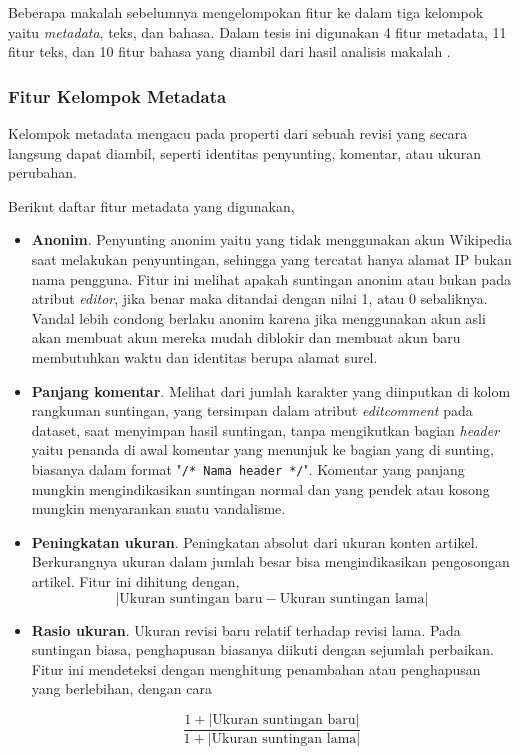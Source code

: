Beberapa makalah sebelumnya mengelompokan fitur ke dalam tiga kelompok yaitu
\textit{metadata}, teks, dan bahasa.
Dalam tesis ini digunakan 4 fitur metadata, 11 fitur teks, dan 10 fitur
bahasa yang diambil dari hasil analisis makalah
\textcite{mola2012wikipedia}.

\subsubsection{Fitur Kelompok Metadata}

Kelompok metadata mengacu pada properti dari sebuah revisi yang secara langsung
dapat diambil, seperti identitas penyunting, komentar, atau ukuran perubahan.

Berikut daftar fitur metadata yang digunakan,

\begin{itemize}

\item \textbf{Anonim}.
Penyunting anonim yaitu yang tidak menggunakan akun Wikipedia saat melakukan
penyuntingan, sehingga yang tercatat hanya alamat IP bukan nama pengguna.
Fitur ini melihat apakah suntingan anonim atau bukan pada atribut
\textit{editor}, jika benar maka ditandai dengan nilai 1, atau 0 sebaliknya.
Vandal lebih condong berlaku anonim karena jika menggunakan akun asli akan
membuat akun mereka mudah diblokir dan membuat akun baru membutuhkan waktu dan
identitas berupa alamat surel.

\item \textbf{Panjang komentar}.
Melihat dari jumlah karakter yang diinputkan di kolom rangkuman suntingan, yang
tersimpan dalam atribut \textit{editcomment} pada dataset, saat menyimpan hasil
suntingan, tanpa mengikutkan bagian \textit{header} yaitu penanda di awal
komentar yang menunjuk ke bagian yang di sunting, biasanya dalam format
"\texttt{/* Nama header */}".
Komentar yang panjang mungkin mengindikasikan suntingan normal dan yang pendek
atau kosong mungkin menyarankan suatu vandalisme.

\pagebreak

\item \textbf{Peningkatan ukuran}.
Peningkatan absolut dari ukuran konten artikel.
Berkurangnya ukuran dalam jumlah besar bisa mengindikasikan
pengosongan artikel. Fitur ini dihitung dengan,
\begin{equation}
|\text{Ukuran suntingan baru} - \text{Ukuran suntingan lama}|
\end{equation}

\item \textbf{Rasio ukuran}.
Ukuran revisi baru relatif terhadap revisi lama.
Pada suntingan biasa, penghapusan biasanya diikuti dengan sejumlah perbaikan.
Fitur ini mendeteksi dengan menghitung penambahan atau penghapusan yang
berlebihan, dengan cara

\begin{equation}
\frac{1 + |\text{Ukuran suntingan baru}|}{1 + |\text{Ukuran suntingan lama}|}
\end{equation}

\end{itemize}


